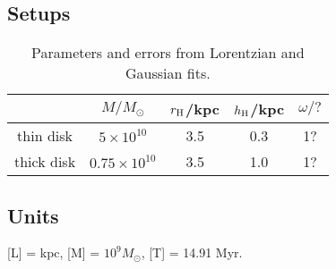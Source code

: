 \subsection*{Setups}
\begin{table}[h]
	\centering
	\begin{tabular}{ccccc}
		& $M/M_\odot$ & $r_{\rm H}$/kpc & $h_{\rm H} $/kpc & $\omega/?$ \\
		\hline
		thin disk & $5 \times 10^{10}$ & 3.5 & 0.3 & 1? \\
		thick disk & $ 0.75 \times 10^{10} $ & 3.5 & 1.0 & 1? \\
	\end{tabular}
	\caption{Parameters and errors from Lorentzian and Gaussian fits.}
	\label{fit params}
\end{table}

\subsection{Units}
[L] = kpc, [M] = $ 10^9 M_\odot $, [T] = 14.91 Myr.

